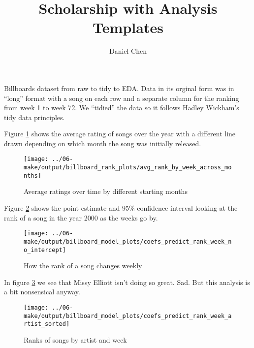 \documentclass[10pt,letterpaper]{article}
\author{Daniel Chen}
\title{Scholarship with Analysis Templates}
\date{}
\begin{document}
\maketitle

Billboards dataset from raw to tidy to EDA.
Data in its orginal form was in ``long'' format with a song on each row and a separate column
for the ranking from week 1 to week 72.
We ``tidied'' the data so it follows Hadley Wickham's tidy data principles.

Figure \ref{fig:avgrankbyweekacrossmonths} shows the average rating of songs
over the year with a different line drawn depending on which month the song was initially released.

\begin{figure}[H]
    \centering
    \texttt{[image: ../06-make/output/billboard\_rank\_plots/avg\_rank\_by\_week\_across\_months]}
    \caption[]{Average ratings over time by different starting months}
    \label{fig:avgrankbyweekacrossmonths}
\end{figure}

Figure \ref{fig:coefspredictrankweeknointercept} shows the point estimate and 95\% confidence interval looking at the rank of a song in the year 2000 as the weeks go by.

\begin{figure}[H]
    \centering
    \texttt{[image: ../06-make/output/billboard\_model\_plots/coefs\_predict\_rank\_week\_no\_intercept]}
    \caption[]{How the rank of a song changes weekly}
    \label{fig:coefspredictrankweeknointercept}
\end{figure}

In figure \ref{fig:coefspredictrankweekartistsorted} we see that Missy Elliott isn't doing so great.
Sad.
But this analysis is a bit nonsensical anyway.

\begin{figure}[H]
    \centering
    \texttt{[image: ../06-make/output/billboard\_model\_plots/coefs\_predict\_rank\_week\_artist\_sorted]}
    \caption{Ranks of songs by artist and week}
    \label{fig:coefspredictrankweekartistsorted}
\end{figure}
\end{document}

